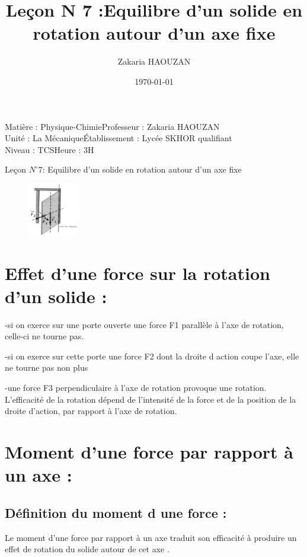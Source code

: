 \documentclass[12pt]{article}
\title{Leçon N 7 :Equilibre d’un solide en rotation autour d’un axe fixe }
\author{Zakaria HAOUZAN}
\date{\today}
\newcommand\headerMe[2]{\noindent{}#1\hfill#2}
\begin{document}
\headerMe{Matière : Physique-Chimie}{Professeur : Zakaria HAOUZAN}\\
\headerMe{Unité : La Mécanique}{Établissement : Lycée SKHOR qualifiant}\\
\headerMe{Niveau : TCS}{Heure : 3H}\\

\begin{center}
    \Large{Leçon $N^{\circ}7$: \color{red}Equilibre d’un solide en rotation autour d’un axe fixe }
\end{center}

\begin{figure}
\includegraphics[width=0.2\textwidth]{./img/img_00.png}
\end{figure}



\section{Effet d’une force sur la rotation d’un solide : }
-si on exerce sur une porte ouverte une force F1 parallèle à l'axe de rotation, celle-ci ne tourne pas.

-si on exerce sur cette porte une force F2 dont la droite d action coupe l'axe, elle ne tourne pas non plus

-une force F3 perpendiculaire à l'axe de rotation provoque une rotation. 
L'efficacité de la rotation dépend de l'intensité de la force et de la position de la droite d'action, par rapport à l'axe de rotation.




\section{Moment d'une force par rapport à un axe : }
\subsection{Définition du moment d une force : }
Le moment d'une force par rapport à un axe traduit son efficacité à produire un effet de rotation du solide autour de cet axe .
\end{document}

